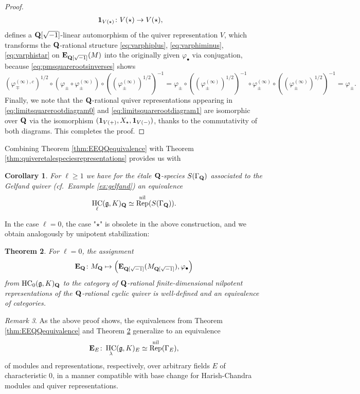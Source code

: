 \documentclass[a4paper,12pt,reqno]{amsart}
\newcommand{\QQ}{{\rm\bf Q}}
\newcommand{\EE}{{\rm\bf E}}
\DeclareMathOperator{\HC}{\mathrm{HC}}
\DeclareMathOperator{\Rep}{\mathrm{Rep}}
\theoremstyle{plain}
\newtheorem{theorem}{Theorem}[section]
\newtheorem{corollary}[theorem]{Corollary}
\theoremstyle{remark}
\newtheorem{remark}[theorem]{Remark}
\begin{document}
\begin{proof}
\begin{align*}
      &{\bf1}_{V(\star)}\colon V(\star)\to V(\star),
    \end{align*}
    defines a $\QQ[\sqrt{-1}]$-linear automorphism of the quiver representation $V$, which transforms the $\QQ$-rational structure \eqref{eq:varphiplus}, \eqref{eq:varphiminus}, \eqref{eq:varphistar} on $\EE_{\QQ[\sqrt{-1}]}(M)$ into the originally given $\varphi_\bullet$ via conjugation, because \eqref{eq:pmsquarerootsinverses} shows
    \[
    (\varphi_{\mp}^{(\infty), c})^{1/2}\circ\left(\varphi_\pm\circ\varphi_\pm^{(\infty)}\right)\circ\left((\varphi_{\pm}^{(\infty)})^{1/2}\right)^{-1}
    =
    \varphi_\pm\circ
    \left((\varphi_{\pm}^{(\infty)})^{1/2}\right)^{-1}\circ
    \varphi_\pm^{(\infty)}\circ\left((\varphi_{\pm}^{(\infty)})^{1/2}\right)^{-1}
    =
    \varphi_{\pm}.
    \]
    Finally, we note that the $\QQ$-rational quiver representations appearing in \eqref{eq:limitsquarerootdiagram0} and \eqref{eq:limitsquarerootdiagram1} are isomorphic over $\QQ$ via the isomorphism $({\bf1}_{V(+)},X_\star,{\bf1}_{V(-)})$, thanks to the commutativity of both diagrams. This completes the proof.
    \end{proof}

    Combining Theorem \ref{thm:EEQQequivalence} with Theorem \ref{thm:quiveretalespeciesrepresentations} provides us with

    \begin{corollary}
      For $\ell\geq 1$ we have for the \'etale $\QQ$-species $S(\Gamma_\QQ)$ associated to the Gelfand quiver (cf.\ Example \ref{ex:gelfand}) an equivalence
      \[
      \HC_\ell(\mathfrak{g}, K)_{\QQ} \simeq \Rep^{\mathrm{nil}}(S(\Gamma_\QQ)).
      \]
    \end{corollary}

    In the case $\ell=0$, the case "$\star$" is obsolete in the above construction, and we obtain analogously by unipotent stabilization:
    \begin{theorem}\label{thm:cyclicEEQQequivalence}
    For $\ell=0$, the assignment
    \[
    \EE_\QQ\colon M_{\QQ}\mapsto \left(\EE_{\QQ[\sqrt{-1}]}(M_{\QQ[\sqrt{-1}]}),\varphi_\bullet\right)
    \]
    from $\HC_0(\mathfrak{g}, K)_{\QQ}$ to the category of $\QQ$-rational finite-dimensional nilpotent representations of the $\QQ$-rational cyclic quiver is well-defined and an equivalence of categories.
    \end{theorem}

    \begin{remark}\label{rmk:generalbases}
      As the above proof shows, the equivalences from Theorem \ref{thm:EEQQequivalence} and Theorem \ref{thm:cyclicEEQQequivalence} generalize to an equivalence
      \[
      \EE_E\colon\HC_\lambda(\mathfrak{g},K)_E \simeq \Rep^{\mathrm{nil}}(\Gamma_E),
      \]
      of modules and representations, respectively, over arbitrary fields $E$ of characteristic $0$, in a manner compatible with base change for Harish-Chandra modules and quiver representations.
    \end{remark}
\end{document}
